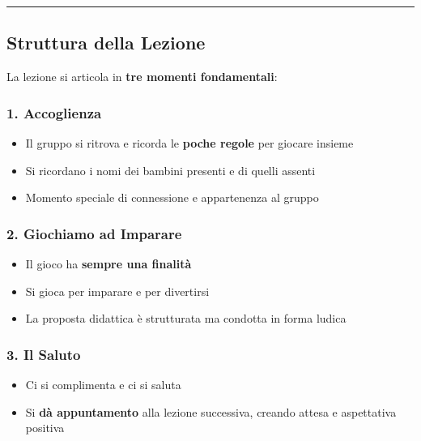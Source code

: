 \documentclass[a4paper,11pt]{article}
\providecommand{\tightlist}{%
  \setlength{\itemsep}{0pt}\setlength{\parskip}{0pt}}
\begin{document}
\begin{center}\rule{0.5\linewidth}{0.5pt}\end{center}

\subsection{Struttura della Lezione}\label{struttura-della-lezione-1}

La lezione si articola in \textbf{tre momenti fondamentali}:

\subsubsection{1. Accoglienza}\label{accoglienza}

\begin{itemize}
      \tightlist
      \item
            Il gruppo si ritrova e ricorda le \textbf{poche regole} per giocare
            insieme
      \item
            Si ricordano i nomi dei bambini presenti e di quelli assenti
      \item
            Momento speciale di connessione e appartenenza al gruppo
\end{itemize}

\subsubsection{2. Giochiamo ad Imparare}\label{giochiamo-ad-imparare}

\begin{itemize}
      \tightlist
      \item
            Il gioco ha \textbf{sempre una finalità}
      \item
            Si gioca per imparare e per divertirsi
      \item
            La proposta didattica è strutturata ma condotta in forma ludica
\end{itemize}

\subsubsection{3. Il Saluto}\label{il-saluto}

\begin{itemize}
      \tightlist
      \item
            Ci si complimenta e ci si saluta
      \item
            Si \textbf{dà appuntamento} alla lezione successiva, creando attesa e
            aspettativa positiva
\end{itemize}
\end{document}
